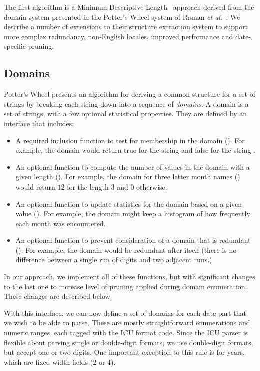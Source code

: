 The first algorithm is a Minimum Descriptive Length~\cite{Rissanen:1978} approach derived from the domain system presented in the Potter's Wheel system of Raman \textit{et al.}~\cite{Raman:2001}. We describe a number of extensions to their structure extraction system to support more complex redundancy, non-English locales, improved performance and date-specific pruning.

\subsection{Domains}
Potter's Wheel presents an algorithm for deriving a common structure for a set of strings by breaking each string down into a sequence of \textit{domains}. A domain is a set of strings, with a few optional statistical properties. They are defined by an interface that includes:
\begin{itemize}
\item A required inclusion function to test for membership in the domain (). 
For example, the domain  would return true for the string  
and false for the string .
\item An optional function to compute the number of values in the domain with a given length ().
For example, the domain for three letter month names () would return $12$ for the length $3$ and $0$ otherwise.
\item An optional function to update statistics for the domain based on a given value ().
For example, the domain  might keep a histogram of how frequently each month was encountered.
\item An optional function to prevent consideration of a domain that is redundant ().
For example, the domain  would be redundant after itself 
(\ie there is no difference between a single run of digits and two adjacent runs.)
\end{itemize}

In our approach, we implement all of these functions, but with significant changes to the last one to increase level of pruning applied during
domain enumeration. These changes are described below.

With this interface, we can now define a set of domains for each date part that we wish to be able to parse. These are mostly straightforward enumerations and numeric ranges, each tagged with the ICU format code. Since the ICU parser is flexible about parsing single or double-digit formats, we use double-digit formats, but accept one or two digits. One important exception to this rule is for years, which are fixed width fields ($2$ or $4$).

